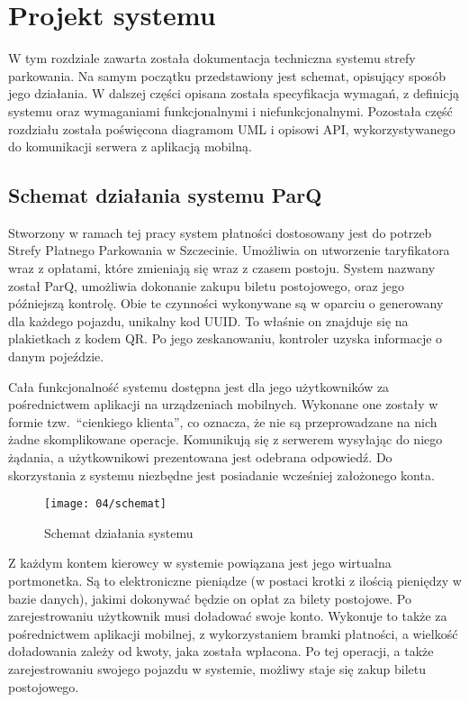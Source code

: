 \setcounter{listing}{0}

\section{Projekt systemu}
W tym rozdziale zawarta została dokumentacja techniczna systemu strefy parkowania. Na samym początku przedstawiony jest schemat, opisujący sposób jego działania. W dalszej części opisana została specyfikacja wymagań, z definicją systemu oraz wymaganiami funkcjonalnymi i niefunkcjonalnymi. Pozostała część rozdziału została poświęcona diagramom UML i opisowi API, wykorzystywanego do komunikacji serwera z aplikacją mobilną. 

\subsection{Schemat działania systemu ParQ}

Stworzony w ramach tej pracy system płatności dostosowany jest do potrzeb Strefy Płatnego Parkowania w Szczecinie. Umożliwia on utworzenie taryfikatora wraz z opłatami, które zmieniają się wraz z czasem postoju. System nazwany został ParQ, umożliwia dokonanie zakupu biletu postojowego, oraz jego późniejszą kontrolę. Obie te czynności wykonywane są w oparciu o generowany dla każdego pojazdu, unikalny kod UUID. To właśnie on znajduje się na plakietkach z kodem QR. Po jego zeskanowaniu, kontroler uzyska informacje o danym pojeździe.

Cała funkcjonalność systemu dostępna jest dla jego użytkowników za pośrednictwem aplikacji na urządzeniach mobilnych. Wykonane one zostały w formie tzw.~``cienkiego klienta'', co oznacza, że nie są przeprowadzane na nich żadne skomplikowane operacje. Komunikują się z serwerem wysyłając do niego żądania, a użytkownikowi prezentowana jest odebrana odpowiedź. Do skorzystania z systemu niezbędne jest posiadanie wcześniej założonego konta.

\begin{figure}[h]
	\begin{center}
		\texttt{[image: 04/schemat]}
	\end{center}
	\caption{Schemat działania systemu}
\end{figure}

Z każdym kontem kierowcy w systemie powiązana jest jego wirtualna portmonetka. Są to elektroniczne pieniądze (w postaci krotki z ilością pieniędzy w bazie danych), jakimi dokonywać będzie on opłat za bilety postojowe. Po zarejestrowaniu użytkownik musi doładować swoje konto. Wykonuje to także za pośrednictwem aplikacji mobilnej, z wykorzystaniem bramki płatności, a wielkość doładowania zależy od kwoty, jaka została wpłacona. Po tej operacji, a także zarejestrowaniu swojego pojazdu w systemie, możliwy staje się zakup biletu postojowego.

